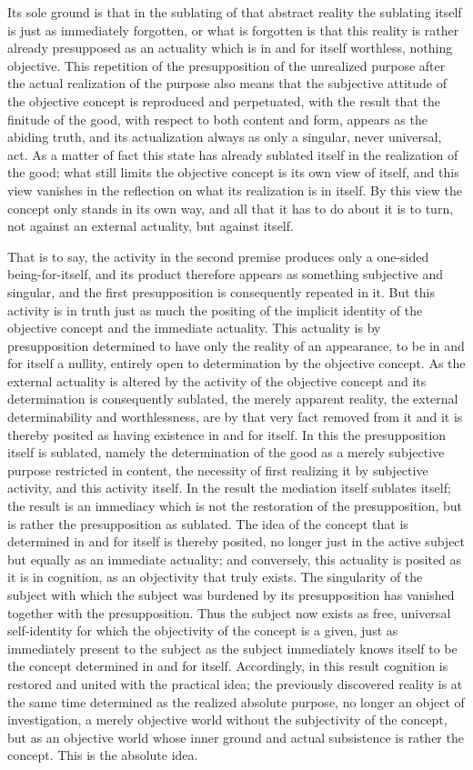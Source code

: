 Its sole ground is that in the sublating of that abstract reality
the sublating itself is just as immediately forgotten,
or what is forgotten is that this reality is
rather already presupposed as an actuality
which is in and for itself worthless, nothing objective.
This repetition of the presupposition of
the unrealized purpose after
the actual realization of the purpose
also means that the subjective attitude of
the objective concept is reproduced and perpetuated,
with the result that the finitude of the good,
with respect to both content and form,
appears as the abiding truth,
and its actualization always as
only a singular, never universal, act.
As a matter of fact this state has
already sublated itself
in the realization of the good;
what still limits the objective concept is
its own view of itself,
and this view vanishes in the reflection
on what its realization is in itself.
By this view the concept only stands in its own way,
and all that it has to do about it is to turn,
not against an external actuality, but against itself.

That is to say, the activity in the second premise
produces only a one-sided being-for-itself,
and its product therefore appears as
something subjective and singular,
and the first presupposition is
consequently repeated in it.
But this activity is in truth just as much
the positing of the implicit identity
of the objective concept and the immediate actuality.
This actuality is by presupposition determined
to have only the reality of an appearance,
to be in and for itself a nullity,
entirely open to determination by the objective concept.
As the external actuality is altered by
the activity of the objective concept
and its determination is consequently sublated,
the merely apparent reality,
the external determinability and worthlessness,
are by that very fact removed from it
and it is thereby posited as having existence
in and for itself.
In this the presupposition itself is sublated,
namely the determination of the good as
a merely subjective purpose restricted in content,
the necessity of first realizing it
by subjective activity,
and this activity itself.
In the result the mediation itself sublates itself;
the result is an immediacy which is not
the restoration of the presupposition,
but is rather the presupposition as sublated.
The idea of the concept that is determined in
and for itself is thereby posited,
no longer just in the active subject but
equally as an immediate actuality;
and conversely, this actuality is posited
as it is in cognition,
as an objectivity that truly exists.
The singularity of the subject with which
the subject was burdened by its presupposition
has vanished together with the presupposition.
Thus the subject now exists
as free, universal self-identity
for which the objectivity of the concept is
a given, just as immediately present to the subject
as the subject immediately knows itself to be
the concept determined in and for itself.
Accordingly, in this result cognition is
restored and united with the practical idea;
the previously discovered reality is
at the same time determined as
the realized absolute purpose,
no longer an object of investigation,
a merely objective world without
the subjectivity of the concept,
but as an objective world whose inner ground
and actual subsistence is rather the concept.
This is the absolute idea.
